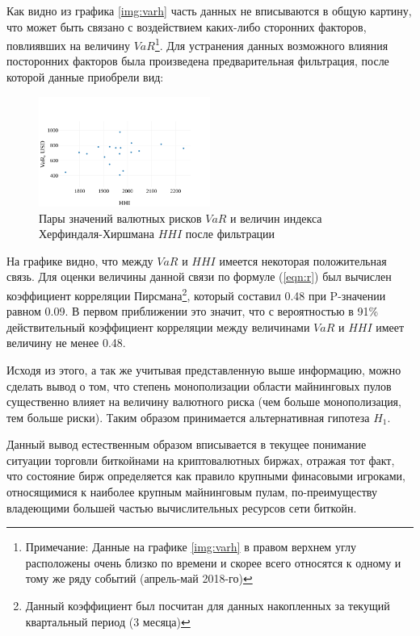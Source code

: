 \documentclass[12pt]{article}
\begin{document}
Как видно из графика \ref{img:varh} часть данных не вписываются в общую картину, что может быть связано с воздействием каких-либо сторонних факторов, повлиявших на величину $VaR$\footnote{Примечание: Данные на графике \ref{img:varh} в правом верхнем углу расположены очень близко по времени и скорее всего относятся к одному и тому же ряду событий (апрель-май 2018-го)}. Для устранения данных возможного влияния посторонних факторов была произведена предварительная фильтрация, после которой данные приобрели вид:

\begin{figure}[H]
\centering
\includegraphics[width=0.5\textwidth]{varh_filtered.png}
\caption{Пары значений валютных рисков $VaR$ и величин индекса Херфиндаля-Хиршмана $HHI$ после фильтрации}
\label{img:varhf}
\end{figure}
На графике видно, что между $VaR$ и $HHI$ имеется некоторая положительная связь. Для оценки величины данной связи по формуле (\ref{eqn:r}) был вычислен коэффициент корреляции Пирсмана\footnote{Данный коэффициент был посчитан для данных накопленных за текущий квартальный период (3 месяца)}, который составил 0.48 при P-значении равном 0.09. В первом приближении это значит, что с вероятностью в 91\% действительный коэффициент корреляции между величинами $VaR$ и $HHI$ имеет величину не менее 0.48. 
\par Исходя из этого, а так же учитывая представленную выше информацию, можно сделать вывод о том, что степень монополизации области майнинговых пулов существенно влияет на величину валютного риска (чем больше монополизация, тем больше риски). Таким образом принимается альтернативная гипотеза $H_1$.
\par Данный вывод естественным образом вписывается в текущее понимание ситуации торговли биткойнами на криптовалютных биржах, отражая тот факт, что состояние бирж определяется как правило крупными финасовыми игроками, относящимися к наиболее крупным майнинговым пулам, по-преимуществу владеющими большей частью вычислительных ресурсов сети биткойн.
\end{document}
